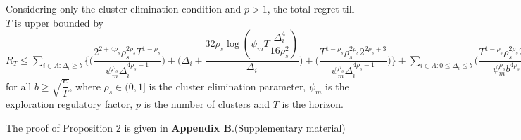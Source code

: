 	
	
	

\begin{proposition}
\label{Result:Prop:2}
Considering only the cluster elimination condition and $p>1$, the total regret till $T$ is upper bounded by $R_{T}\leq \sum\limits_{i\in A:\Delta_{i}\geq b}\bigg\lbrace \bigg(\dfrac{2^{2+4\rho_{s}}\rho_{s}^{2\rho_{s}}T^{1-\rho_{s}}}{\psi_{m}^{\rho_{s}}\Delta_{i}^{4\rho_{s}-1}}\bigg) + \bigg(\Delta_{i}+\dfrac{32\rho_{s}\log{(\psi_{m}T\dfrac{\Delta_{i}^{4}}{16\rho_{s}^{2}})}}{\Delta_{i}}\bigg)  +  \bigg(\dfrac{T^{1-\rho_{s}}\rho_{s}^{2\rho_{s}}2^{2\rho_{s}+3}}{\psi_{m}^{\rho_{s}}\Delta_{i}^{4\rho_{s} -1}} \bigg)\bigg \rbrace +\sum\limits_{i\in A:0\leq\Delta_{i}\leq b}\bigg(\dfrac{T^{1-\rho_{s}}\rho_{s}^{2\rho_{s}}2^{2\rho_{s}+3}}{\psi_{m}^{\rho_{s}}b^{4\rho_{s} -1}} \bigg) + max_{i:\Delta_{i}\leq b}\Delta_{i}T$ for all $b\geq \sqrt{\dfrac{e}{T}}$, where $\rho_{s}\in (0,1]$ is the cluster elimination parameter, $\psi_{m}$ is the exploration regulatory factor, $p$ is the number of clusters and $T$ is the horizon.
\end{proposition}

	The proof of Proposition 2 is given in \textbf{Appendix B}.(Supplementary material)




